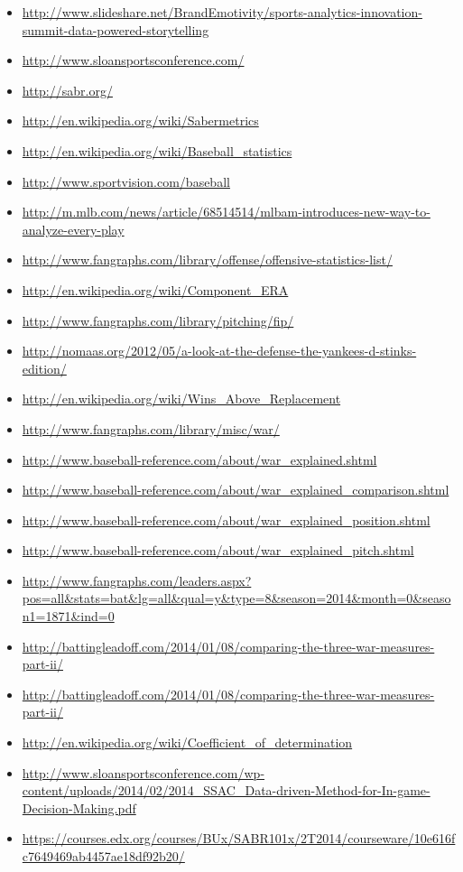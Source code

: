 \begin{itemize}
\item
  \url{http://www.slideshare.net/BrandEmotivity/sports-analytics-innovation-summit-data-powered-storytelling}
\item
  \url{http://www.sloansportsconference.com/}
\item
  \url{http://sabr.org/}
\item
  \url{http://en.wikipedia.org/wiki/Sabermetrics}
\item
  \url{http://en.wikipedia.org/wiki/Baseball_statistics}
\item
  \url{http://www.sportvision.com/baseball}
\item
  \url{http://m.mlb.com/news/article/68514514/mlbam-introduces-new-way-to-analyze-every-play}
\item
  \url{http://www.fangraphs.com/library/offense/offensive-statistics-list/}
\item
  \url{http://en.wikipedia.org/wiki/Component_ERA}
\item
  \url{http://www.fangraphs.com/library/pitching/fip/}
\item
  \url{http://nomaas.org/2012/05/a-look-at-the-defense-the-yankees-d-stinks-edition/}
\item
  \url{http://en.wikipedia.org/wiki/Wins_Above_Replacement}
\item
  \url{http://www.fangraphs.com/library/misc/war/}
\item
  \url{http://www.baseball-reference.com/about/war_explained.shtml}
\item
  \url{http://www.baseball-reference.com/about/war_explained_comparison.shtml}
\item
  \url{http://www.baseball-reference.com/about/war_explained_position.shtml}
\item
  \url{http://www.baseball-reference.com/about/war_explained_pitch.shtml}
\item
  \url{http://www.fangraphs.com/leaders.aspx?pos=all\&stats=bat\&lg=all\&qual=y\&type=8\&season=2014\&month=0\&season1=1871\&ind=0}
\item
  \url{http://battingleadoff.com/2014/01/08/comparing-the-three-war-measures-part-ii/}
\item
  \url{http://battingleadoff.com/2014/01/08/comparing-the-three-war-measures-part-ii/}
\item
  \url{http://en.wikipedia.org/wiki/Coefficient_of_determination}
\item
  \url{http://www.sloansportsconference.com/wp-content/uploads/2014/02/2014_SSAC_Data-driven-Method-for-In-game-Decision-Making.pdf}
\item
  \url{https://courses.edx.org/courses/BUx/SABR101x/2T2014/courseware/10e616fc7649469ab4457ae18df92b20/}
\end{itemize}


